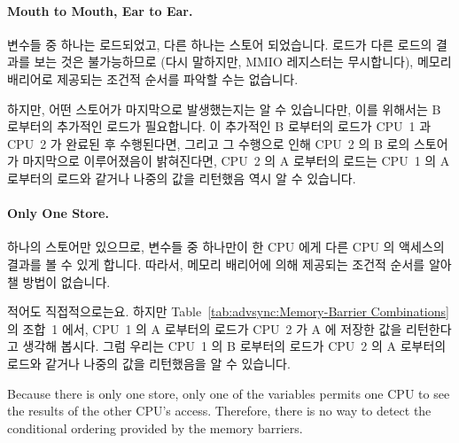 \paragraph{Mouth to Mouth, Ear to Ear.}
	변수들 중 하나는 로드되었고, 다른 하나는 스토어 되었습니다.
	로드가 다른 로드의 결과를 보는 것은 불가능하므로 (다시 말하지만, MMIO
	레지스터는 무시합니다), 메모리 배리어로 제공되는 조건적 순서를 파악할
	수는 없습니다.

	하지만, 어떤 스토어가 마지막으로 발생했는지는 알 수 있습니다만, 이를
	위해서는 B 로부터의 추가적인 로드가 필요합니다.
	이 추가적인 B 로부터의 로드가 CPU~1 과 CPU~2 가 완료된 후 수행된다면,
	그리고 그 수행으로 인해 CPU~2 의 B 로의 스토어가 마지막으로
	이루어졌음이 밝혀진다면, CPU~2 의 A 로부터의 로드는 CPU~1 의 A 로부터의
	로드와 같거나 나중의 값을 리턴했음 역시 알 수 있습니다.

\paragraph{Only One Store.}
	하나의 스토어만 있으므로, 변수들 중 하나만이 한 CPU 에게 다른 CPU 의
	액세스의 결과를 볼 수 있게 합니다.
	따라서, 메모리 배리어에 의해 제공되는 조건적 순서를 알아챌 방법이
	없습니다.

	적어도 직접적으로는요.
	하지만 Table~\ref{tab:advsync:Memory-Barrier Combinations} 의 조합~1
	에서, CPU~1 의 A 로부터의 로드가 CPU~2 가 A 에 저장한 값을 리턴한다고
	생각해 봅시다.
	그럼 우리는 CPU~1 의 B 로부터의 로드가 CPU~2 의 A 로부터의 로드와
	같거나 나중의 값을 리턴했음을 알 수 있습니다.
	\iffalse

	Because there is only one store, only one of the variables
	permits one CPU to see the results of the other CPU's
	access.
	Therefore, there is no way to detect the
	conditional ordering provided by the memory barriers.

